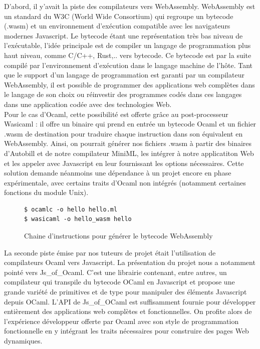 \documentclass[12pt]{article}
\begin{document}
D'abord, il y'avait la piste des compilateurs vers WebAssembly. WebAssembly est un standard du W3C (World Wide Consortium) qui regroupe un bytecode (.wasm) et un environnement d'exécution compatible avec les navigateurs modernes Javascript. Le bytecode étant une représentation très bas niveau de l'exécutable, l'idée principale est de compiler un langage de programmation plus haut niveau, comme C/C++, Rust,.. vers bytecode. Ce bytecode est par la suite compilé par l'environnement d'exécution dans le langage machine de l'hôte. Tant que le support d'un langage de programmation est garanti par un compilateur WebAssembly, il est possible de programmer des applications web complètes dans le langage de son choix ou réinvestir des programmes codés dans ces langages dans une application codée avec des technologies Web. \\
Pour le cas d'Ocaml, cette possibilité est offerte grâce au post-processeur Wasicaml : il offre un binaire qui prend en entrée un bytecode Ocaml et un fichier .wasm de destination pour traduire chaque instruction dans son équivalent en WebAssembly. Ainsi, on pourrait générer nos fichiers .wasm à partir des binaires d'Autobill et de notre compilateur MiniML, les intégrer à notre applicatiton Web et les appeler avec Javascript en leur fournissant les options nécessaires. Cette solution demande néanmoins une dépendance à un projet encore en phase expérimentale, avec certains traits d'Ocaml non intégrés (notamment certaines fonctions du module Unix).\\
\begin{figure}
      \begin{lstlisting}
$ ocamlc -o hello hello.ml
$ wasicaml -o hello_wasm hello
\end{lstlisting}
      \caption{Chaine d'instructions pour générer le bytecode WebAssembly}
\end{figure}

La seconde piste émise par nos tuteurs de projet était l'utilisation de compilateurs Ocaml vers Javascript. La présentation du projet nous a notamment pointé vers Js\_of\_Ocaml. C'est une librairie contenant, entre autres, un compilateur qui transpile du bytecode OCaml en Javascript et propose une grande variété de primitives et de type pour manipuler des éléments Javascript depuis OCaml. L'API de Js\_of\_OCaml est suffisamment fournie pour développer entièrement des applications web complètes et fonctionnelles. On profite alors de l'expérience développeur offerte par Ocaml avec son style de programmation fonctionnelle en y intégrant les traits nécessaires pour construire des pages Web dynamiques.\\
\end{document}

